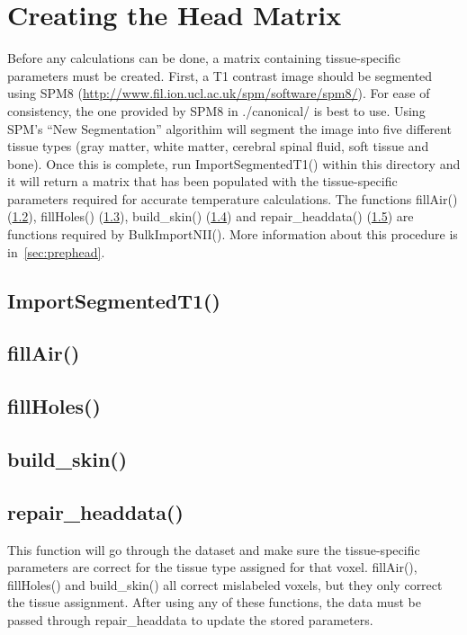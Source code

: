 \section{Creating the Head Matrix}
\label{sec:headmatrix}
Before any calculations can be done, a matrix containing tissue-specific parameters must be created.  First, a T1 contrast image should be segmented using SPM8 (\url{http://www.fil.ion.ucl.ac.uk/spm/software/spm8/}).  For ease of consistency, the one provided by SPM8 in ./canonical/ is best to use.  Using SPM's ``New Segmentation'' algorithim will segment the image into five different tissue types (gray matter, white matter, cerebral spinal fluid, soft tissue and bone).  Once this is complete, run ImportSegmentedT1() within this directory and it will return a matrix that has been populated with the tissue-specific parameters required for accurate temperature calculations. The functions fillAir() (\ref{ass:fillair}), fillHoles() (\ref{ass:fillHoles}), build\_skin() (\ref{ass:buildskin}) and repair\_headdata() (\ref{ass:repairheaddata}) are functions required by BulkImportNII().  More information about this procedure is in~\cref{sec:prephead}.
\subsection{ImportSegmentedT1()}

\subsection{fillAir()}
\label{ass:fillair}

\subsection{fillHoles()}
\label{ass:fillHoles}

\subsection{build\_skin()}
\label{ass:buildskin}

\subsection{repair\_headdata()}
\label{ass:repairheaddata}
This function will go through the dataset and make sure the tissue-specific parameters are correct for the tissue type assigned for that voxel.  fillAir(), fillHoles() and build\_skin() all correct mislabeled voxels, but they only correct the tissue assignment.  After using any of these functions, the data must be passed through repair\_headdata to update the stored parameters.

\clearpage
